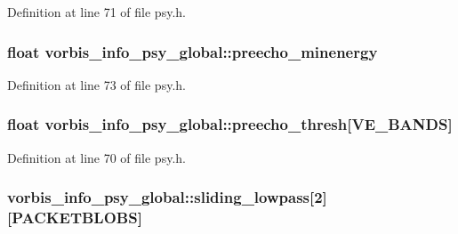 Definition at line 71 of file psy.\+h.

\subsubsection[{\texorpdfstring{preecho\+\_\+minenergy}{preecho_minenergy}}]{\setlength{\rightskip}{0pt plus 5cm}float vorbis\+\_\+info\+\_\+psy\+\_\+global\+::preecho\+\_\+minenergy}\hypertarget{structvorbis__info__psy__global_a4b33ed2b895f683a5ed47ea81f65d7cf}{}\label{structvorbis__info__psy__global_a4b33ed2b895f683a5ed47ea81f65d7cf}


Definition at line 73 of file psy.\+h.

\subsubsection[{\texorpdfstring{preecho\+\_\+thresh}{preecho_thresh}}]{\setlength{\rightskip}{0pt plus 5cm}float vorbis\+\_\+info\+\_\+psy\+\_\+global\+::preecho\+\_\+thresh\mbox{[}{\bf V\+E\+\_\+\+B\+A\+N\+DS}\mbox{]}}\hypertarget{structvorbis__info__psy__global_a6c556b0f7a648c916c9ff2042d1e63ab}{}\label{structvorbis__info__psy__global_a6c556b0f7a648c916c9ff2042d1e63ab}


Definition at line 70 of file psy.\+h.

\subsubsection[{\texorpdfstring{sliding\+\_\+lowpass}{sliding_lowpass}}]{ vorbis\+\_\+info\+\_\+psy\+\_\+global\+::sliding\+\_\+lowpass\mbox{[}2\mbox{]}\mbox{[}{\bf P\+A\+C\+K\+E\+T\+B\+L\+O\+BS}\mbox{]}}\hypertarget{structvorbis__info__psy__global_a5d1433d9b0be686fcb7e9a9060457118}{}\label{structvorbis__info__psy__global_a5d1433d9b0be686fcb7e9a9060457118}


